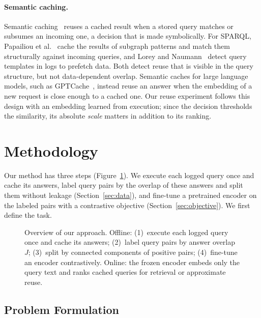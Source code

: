 \documentclass[runningheads]{llncs}
\begin{document}
\paragraph{Semantic caching.}
Semantic caching~\cite{dar1996semanticcaching} reuses a cached result when a
stored query matches or subsumes an incoming one, a decision that is made
symbolically. For SPARQL, Papailiou et al.~\cite{papailiou2015caching} cache
the results of subgraph patterns and match them structurally against incoming
queries, and Lorey and Naumann~\cite{lorey2013templates} detect query
templates in logs to prefetch data. Both detect reuse that is visible in the
query structure, but not data-dependent overlap. Semantic caches for large
language models, such as GPTCache~\cite{bang2023gptcache}, instead reuse an
answer when the embedding of a new request is close enough to a cached one.
Our reuse experiment follows this design with an embedding learned from
execution; since the decision thresholds the similarity, its absolute
\emph{scale} matters in addition to its ranking.

\section{Methodology}
\label{sec:method}

Our method has three steps (Figure~\ref{fig:pipeline}). We execute each
logged query once and cache its answers, label query pairs by the overlap of
these answers and split them without leakage (Section~\ref{sec:data}), and
fine-tune a pretrained encoder on the labeled pairs with a contrastive
objective (Section~\ref{sec:objective}). We first define the task.

\begin{figure}[t]
\centering

\caption{Overview of our approach. Offline: (1)~execute each logged query
once and cache its answers; (2)~label query pairs by answer overlap $J$;
(3)~split by connected components of positive pairs; (4)~fine-tune an
encoder contrastively. Online: the frozen encoder embeds only the query text
and ranks cached queries for retrieval or approximate reuse.}
\label{fig:pipeline}
\end{figure}

\subsection{Problem Formulation}
\label{sec:problem}
\end{document}
